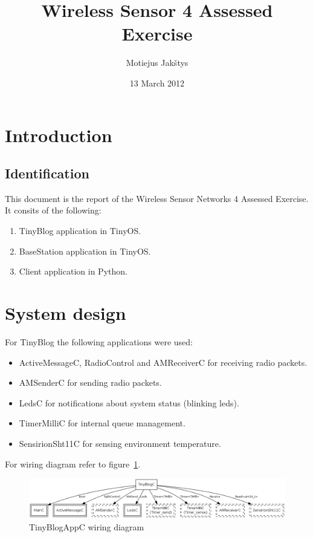 \documentclass[english,11pt]{article}
\numberwithin{equation}{section}
\begin{document}
\title{Wireless Sensor 4 Assessed Exercise}
\author{Motiejus Jakštys}
\date{13 March 2012}

\maketitle
\tableofcontents
\pagebreak

\section{Introduction}

\subsection{Identification}

This document is the report of the Wireless Sensor Networks 4 Assessed Exercise.
It consits of the following:

\begin{enumerate}
    \item TinyBlog application in TinyOS.
    \item BaseStation application in TinyOS.
    \item Client application in Python.
\end{enumerate}

\section{System design}

For TinyBlog the following applications were used:
\begin{itemize}
    \item ActiveMessageC, RadioControl and AMReceiverC for receiving radio
        packets.
    \item AMSenderC for sending radio packets.
    \item LedsC for notifications about system status (blinking leds).
    \item TimerMilliC for internal queue management.
    \item SensirionSht11C for sensing environment temperature.
\end{itemize}

For wiring diagram refer to figure~\ref{fig:wiring_diagram}.

\begin{figure}
    \centering
    \includegraphics[width=\textwidth]{TinyBlogAppC.png}
    \caption{TinyBlogAppC wiring diagram}
    \label{fig:wiring_diagram}
\end{figure}
\end{document}

